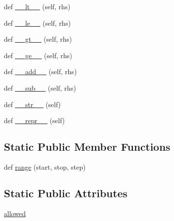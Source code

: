 \begin{DoxyCompactItemize}
\item 
def \hyperlink{classmatplotlib_1_1testing_1_1jpl__units_1_1Epoch_1_1Epoch_a2c06eca99546f9a987b7521c3e98f308}{\+\_\+\+\_\+lt\+\_\+\+\_\+} (self, rhs)
\item 
def \hyperlink{classmatplotlib_1_1testing_1_1jpl__units_1_1Epoch_1_1Epoch_a3da48e8c8801e181c9613b13f9f0c4cf}{\+\_\+\+\_\+le\+\_\+\+\_\+} (self, rhs)
\item 
def \hyperlink{classmatplotlib_1_1testing_1_1jpl__units_1_1Epoch_1_1Epoch_a6cd6d344e38b3215db2cc53418721c40}{\+\_\+\+\_\+gt\+\_\+\+\_\+} (self, rhs)
\item 
def \hyperlink{classmatplotlib_1_1testing_1_1jpl__units_1_1Epoch_1_1Epoch_a6cda83358edcced998295ff5e667a922}{\+\_\+\+\_\+ge\+\_\+\+\_\+} (self, rhs)
\item 
def \hyperlink{classmatplotlib_1_1testing_1_1jpl__units_1_1Epoch_1_1Epoch_aa6922399f5591aaa30e9b2bf027bcc65}{\+\_\+\+\_\+add\+\_\+\+\_\+} (self, rhs)
\item 
def \hyperlink{classmatplotlib_1_1testing_1_1jpl__units_1_1Epoch_1_1Epoch_ac42414b34d3553c9b0d85c38a3e9c20a}{\+\_\+\+\_\+sub\+\_\+\+\_\+} (self, rhs)
\item 
def \hyperlink{classmatplotlib_1_1testing_1_1jpl__units_1_1Epoch_1_1Epoch_a5ab76cd90e567e495cb1a097af3ae968}{\+\_\+\+\_\+str\+\_\+\+\_\+} (self)
\item 
def \hyperlink{classmatplotlib_1_1testing_1_1jpl__units_1_1Epoch_1_1Epoch_a250269815ed07b1c16769f36554e9d18}{\+\_\+\+\_\+repr\+\_\+\+\_\+} (self)
\end{DoxyCompactItemize}
\subsection*{Static Public Member Functions}
\begin{DoxyCompactItemize}
\item 
def \hyperlink{classmatplotlib_1_1testing_1_1jpl__units_1_1Epoch_1_1Epoch_aba60ac2d8ceca3fcc161b668875b67e2}{range} (start, stop, step)
\end{DoxyCompactItemize}
\subsection*{Static Public Attributes}
\begin{DoxyCompactItemize}
\item 
\hyperlink{classmatplotlib_1_1testing_1_1jpl__units_1_1Epoch_1_1Epoch_a5dee9539942601cac70651c09373e136}{allowed}
\end{DoxyCompactItemize}


